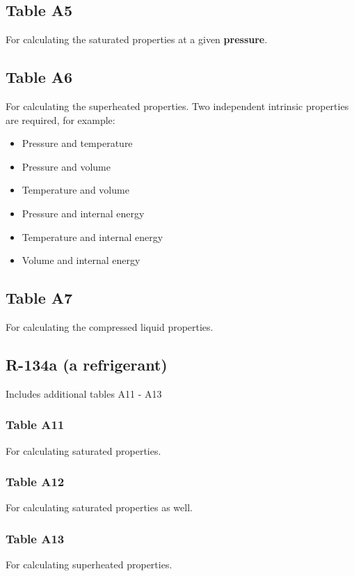 \documentclass[11pt]{article}
\begin{document}
\subsection{Table A5}
\label{sec:orgcf85d79}
For calculating the saturated properties at a given \textbf{pressure}.

\subsection{Table A6}
\label{sec:org15eabfa}
For calculating the superheated properties. Two independent intrinsic properties are required, for example:
\begin{itemize}
\item Pressure and temperature
\item Pressure and volume
\item Temperature and volume
\item Pressure and internal energy
\item Temperature and internal energy
\item Volume and internal energy
\end{itemize}

\subsection{Table A7}
\label{sec:org872dc63}
For calculating the compressed liquid properties.

\subsection{R-134a (a refrigerant)}
\label{sec:orgc1c57ce}
Includes additional tables A11 - A13

\subsubsection{Table A11}
\label{sec:orgaef8991}
For calculating saturated properties.

\subsubsection{Table A12}
\label{sec:org834b43c}
For calculating saturated properties as well.

\subsubsection{Table A13}
\label{sec:org104ee6c}
For calculating superheated properties.
\end{document}
